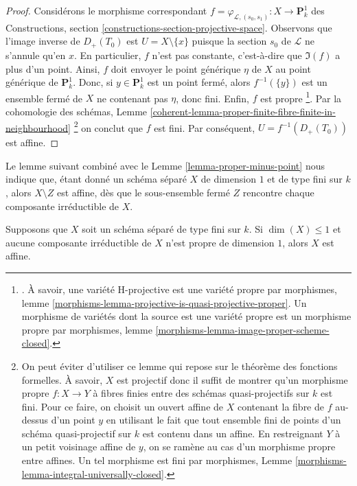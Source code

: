 \begin{proof}
\medskip\noindent
Considérons le morphisme correspondant $f = \varphi_{\mathcal{L},
(s_0, s_1)} : X \to \mathbf{P}^1_k$ des Constructions, section
\ref{constructions-section-projective-space}. Observons que
l'image inverse de $D_{+}(T_0)$ est $U = X \setminus \{x\}$
puisque la section $s_0$ de $\mathcal{L}$ ne s'annule qu'en $x$.
En particulier, $f$ n'est pas constante, c'est-à-dire que $\Im(f)$
a plus d'un point. Ainsi, $f$ doit envoyer le point générique
$\eta$ de $X$ au point générique de $\mathbf{P}^1_k$. Donc, si $y
\in \mathbf{P}^1_k$ est un point fermé, alors $f^{-1}(\{y\})$ est
un ensemble fermé de $X$ ne contenant pas $\eta$, donc fini. Enfin,
$f$ est propre \footnote {. À savoir, une variété H-projective est
une variété propre par morphismes, lemme
\ref{morphisms-lemma-projective-is-quasi-projective-proper}. Un
morphisme de variétés dont la source est une variété propre est un
morphisme propre par morphismes, lemme
\ref{morphisms-lemma-image-proper-scheme-closed}. }. Par la cohomologie
des schémas, Lemme
\ref{coherent-lemma-proper-finite-fibre-finite-in-neighbourhood} \footnote {
On peut éviter d'utiliser ce lemme qui repose sur le théorème des fonctions
formelles. À savoir, $X$ est projectif donc il suffit de montrer qu'un
morphisme propre $f : X \to Y$ à fibres finies entre des schémas
quasi-projectifs sur $k$ est fini. Pour ce faire, on choisit un ouvert affine
de $X$ contenant la fibre de $f$ au-dessus d'un point $y$ en utilisant le fait
que tout ensemble fini de points d'un schéma quasi-projectif sur $k$ est
contenu dans un affine. En restreignant $Y$ à un petit voisinage affine de $y$,
on se ramène au cas d'un morphisme propre entre affines. Un tel morphisme est
fini par morphismes, Lemme \ref{morphisms-lemma-integral-universally-closed}. }
on conclut que $f$ est fini. Par conséquent, $U = f^{-1}(D_{+}(T_0))$ est affine.
\end{proof}

\noindent
Le lemme suivant combiné avec le Lemme \ref{lemma-proper-minus-point}
nous indique que, étant donné un schéma séparé $X$ de dimension $1$ et
de type fini sur $k$, alors $X \setminus Z$ est affine, dès que le
sous-ensemble fermé $Z$ rencontre chaque composante irréductible de $X$.

\begin{lemma}
\label{lemma-dim-1-nonproper-affine}
Supposons que $X$ soit un schéma séparé de type fini sur
$k$. Si $\dim(X) \leq 1$ et aucune composante irréductible
de $X$ n'est propre de dimension $1$, alors $X$ est affine.
\end{lemma}

